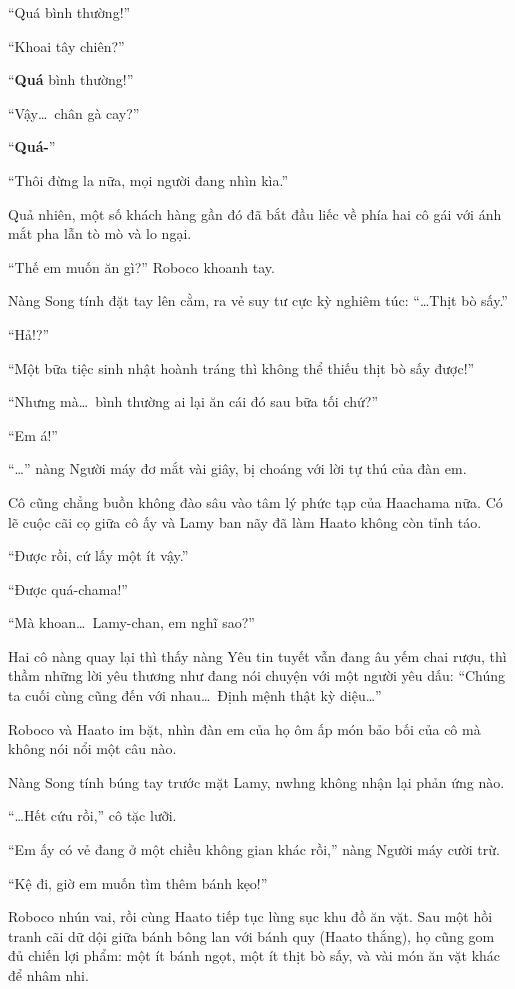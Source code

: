 \documentclass[../main.tex]{subfiles}
\begin{document}
``Quá bình thường!''

``Khoai tây chiên?''

``\textbf{Quá} bình thường!''

``Vậy\dots\ chân gà cay?''

``\textbf{Quá-}''

``Thôi đừng la nữa, mọi người đang nhìn kìa.''

Quả nhiên, một số khách hàng gần đó đã bắt đầu liếc về phía hai cô gái với ánh mắt pha lẫn tò mò và lo ngại.

``Thế em muốn ăn gì?'' Roboco khoanh tay.

Nàng Song tính đặt tay lên cằm, ra vẻ suy tư cực kỳ nghiêm túc: ``\dots Thịt bò sấy.''

``Hả!?''

``Một bữa tiệc sinh nhật hoành tráng thì không thể thiếu thịt bò sấy được!''

``Nhưng mà\dots\ bình thường ai lại ăn cái đó sau bữa tối chứ?''

``Em á!''

``\dots'' nàng Người máy đơ mắt vài giây, bị choáng với lời tự thú của đàn em.

Cô cũng chẳng buồn không đào sâu vào tâm lý phức tạp của Haachama nữa. Có lẽ cuộc cãi cọ giữa cô ấy và Lamy ban nãy đã làm Haato không còn tỉnh táo.

``Được rồi, cứ lấy một ít vậy.''

``Được quá-chama!''

``Mà khoan\dots\ Lamy-chan, em nghĩ sao?''

Hai cô nàng quay lại thì thấy nàng Yêu tin tuyết vẫn đang âu yếm chai rượu, thì thầm những lời yêu thương như đang nói chuyện với một người yêu dấu: ``Chúng ta cuối cùng cũng đến với nhau\dots\ Định mệnh thật kỳ diệu\dots''

Roboco và Haato im bặt, nhìn đàn em của họ ôm ấp món bảo bối của cô mà không nói nổi một câu nào.

Nàng Song tính búng tay trước mặt Lamy, nwhng không nhận lại phản ứng nào.

``\dots Hết cứu rồi,'' cô tặc lưỡi.

``Em ấy có vẻ đang ở một chiều không gian khác rồi,'' nàng Người máy cười trừ.

``Kệ đi, giờ em muốn tìm thêm bánh kẹo!''

Roboco nhún vai, rồi cùng Haato tiếp tục lùng sục khu đồ ăn vặt. Sau một hồi tranh cãi dữ dội giữa bánh bông lan với bánh quy (Haato thắng), họ cũng gom đủ chiến lợi phẩm: một ít bánh ngọt, một ít thịt bò sấy, và vài món ăn vặt khác để nhâm nhi.
\end{document}
